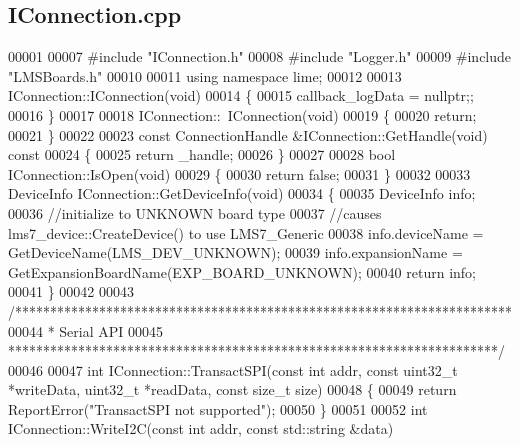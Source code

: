 \subsection{I\+Connection.\+cpp}
\label{IConnection_8cpp_source}

\begin{DoxyCode}
00001 
00007 \textcolor{preprocessor}{#include "IConnection.h"}
00008 \textcolor{preprocessor}{#include "Logger.h"}
00009 \textcolor{preprocessor}{#include "LMSBoards.h"}
00010 
00011 \textcolor{keyword}{using namespace }lime;
00012 
00013 IConnection::IConnection(\textcolor{keywordtype}{void})
00014 \{
00015     callback_logData = \textcolor{keyword}{nullptr};;
00016 \}
00017 
00018 IConnection::~IConnection(\textcolor{keywordtype}{void})
00019 \{
00020     \textcolor{keywordflow}{return};
00021 \}
00022 
00023 \textcolor{keyword}{const} ConnectionHandle &IConnection::GetHandle(\textcolor{keywordtype}{void})\textcolor{keyword}{ const}
00024 \textcolor{keyword}{}\{
00025     \textcolor{keywordflow}{return} _handle;
00026 \}
00027 
00028 \textcolor{keywordtype}{bool} IConnection::IsOpen(\textcolor{keywordtype}{void})
00029 \{
00030     \textcolor{keywordflow}{return} \textcolor{keyword}{false};
00031 \}
00032 
00033 DeviceInfo IConnection::GetDeviceInfo(\textcolor{keywordtype}{void})
00034 \{
00035     DeviceInfo info;
00036     \textcolor{comment}{//initialize to UNKNOWN board type}
00037     \textcolor{comment}{//causes lms7\_device::CreateDevice() to use LMS7\_Generic}
00038     info.deviceName = GetDeviceName(LMS_DEV_UNKNOWN);
00039     info.expansionName = GetExpansionBoardName(EXP_BOARD_UNKNOWN);
00040     \textcolor{keywordflow}{return} info;
00041 \}
00042 
00043 \textcolor{comment}{/***********************************************************************}
00044 \textcolor{comment}{ * Serial API}
00045 \textcolor{comment}{ **********************************************************************/}
00046 
00047 \textcolor{keywordtype}{int} IConnection::TransactSPI(\textcolor{keyword}{const} \textcolor{keywordtype}{int} addr, \textcolor{keyword}{const} uint32\_t *writeData, uint32\_t *readData, \textcolor{keyword}{const} \textcolor{keywordtype}{size\_t} 
      size)
00048 \{
00049     \textcolor{keywordflow}{return} ReportError(\textcolor{stringliteral}{"TransactSPI not supported"});
00050 \}
00051 
00052 \textcolor{keywordtype}{int} IConnection::WriteI2C(\textcolor{keyword}{const} \textcolor{keywordtype}{int} addr, \textcolor{keyword}{const} std::string &data)

\end{DoxyCode}
